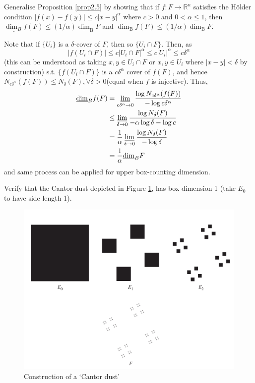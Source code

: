 \documentclass[12pt, a4paper]{article}
\begin{document}
\begin{customexercise}{2.2}
    Generalise Proposition \ref{prop2.5} by showing that if $f: F \rightarrow \mathbb{R}^{n}$ satisfies the Hölder condition $|f(x)-f(y)| \leq c|x-y|^{\alpha}$ where $c>0$ and $0<\alpha \leq 1$, then $\underline{\operatorname{dim}_{B}} f(F) \leq(1 / \alpha) \underline{\operatorname{dim}}_{\mathrm{B}} F$ and $\overline{\operatorname{dim}}_{\mathrm{B}} f(F) \leq(1 / \alpha) \overline{\operatorname{dim}}_{\mathrm{B}} F$.
\end{customexercise}

\begin{customsol}{2.2}
    Note that if $\{U_i\}$ is a $\delta$-cover of $F$, then so $\{U_i\cap F\}$. Then, as
    $$
    |f(U_i\cap F)|\leq c|U_i\cap F|^\alpha\leq c|U_i|^\alpha\leq c\delta^\alpha
    $$
    (this can be understood as taking $x, y\in U_i\cap F$ or $x, y\in U_i$ where $|x-y|<\delta$ by construction)
    s.t. $\{f(U_i\cap F)\}$ is a $c\delta^\alpha$ cover of $f(F)$, and hence $N_{c\delta^\alpha}(f(F)) \leq N_\delta(F), \forall \delta>0$(equal when $f$ is injective). Thus,
    $$
    \begin{aligned} \underline{\operatorname{dim}}_{B} f(F) &=\varliminf_{c \delta^{\alpha} \rightarrow 0} \frac{\log N_{c \delta^{\alpha}}(f(F))}{-\log c \delta^{\alpha}} \\
        &\leq \varliminf_{\delta \rightarrow 0} \frac{\log N_{\delta}(F)}{-\alpha \log \delta-\log c} \\ &=\frac{1}{\alpha} \varliminf_{\delta \rightarrow 0} \frac{\log N_{\delta}(F)}{-\log \delta}\\
        &=\frac{1}{\alpha} \underline{\operatorname{dim}}_{B} F \end{aligned}
    $$
    and same process can be applied for upper box-counting dimension. 
\end{customsol}


\begin{customexercise}{2.4}\label{calculation}
    Verify that the Cantor dust depicted in Figure \ref{fig:cantordust}, has box dimension 1 (take $E_{0}$ to have side length 1).
    \begin{figure}[H]
        \centering
        \includegraphics[width=.66\textwidth]{images/cantordust.png}
        \caption{ Construction of a ‘Cantor dust’ }
        \label{fig:cantordust}
    \end{figure}
\end{customexercise}
\end{document}
